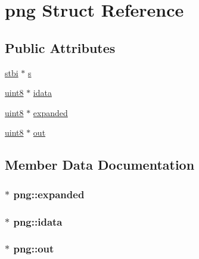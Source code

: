 \hypertarget{structpng}{}\section{png Struct Reference}
\label{structpng}
\subsection*{Public Attributes}
\begin{DoxyCompactItemize}
\item 
\hyperlink{structstbi}{stbi} $\ast$ \hyperlink{structpng_a77d3bfd0ae8f598a475317ed39e78fd0}{s}
\item 
\hyperlink{stb__image_8c_adde6aaee8457bee49c2a92621fe22b79}{uint8} $\ast$ \hyperlink{structpng_a5cd944fdf0f0417a344bcc538ed98ed6}{idata}
\item 
\hyperlink{stb__image_8c_adde6aaee8457bee49c2a92621fe22b79}{uint8} $\ast$ \hyperlink{structpng_a474dd0da8ac0347924e68f5de7e68c55}{expanded}
\item 
\hyperlink{stb__image_8c_adde6aaee8457bee49c2a92621fe22b79}{uint8} $\ast$ \hyperlink{structpng_ada33c39620ad9a647c088c40d21887f6}{out}
\end{DoxyCompactItemize}


\subsection{Member Data Documentation}
\hypertarget{structpng_a474dd0da8ac0347924e68f5de7e68c55}{}
\subsubsection[{expanded}]{ $\ast$ png\+::expanded}\label{structpng_a474dd0da8ac0347924e68f5de7e68c55}
\hypertarget{structpng_a5cd944fdf0f0417a344bcc538ed98ed6}{}
\subsubsection[{idata}]{$\ast$ png\+::idata}\label{structpng_a5cd944fdf0f0417a344bcc538ed98ed6}
\hypertarget{structpng_ada33c39620ad9a647c088c40d21887f6}{}
\subsubsection[{out}]{ $\ast$ png\+::out}\label{structpng_ada33c39620ad9a647c088c40d21887f6}
\hypertarget{structpng_a77d3bfd0ae8f598a475317ed39e78fd0}{}
